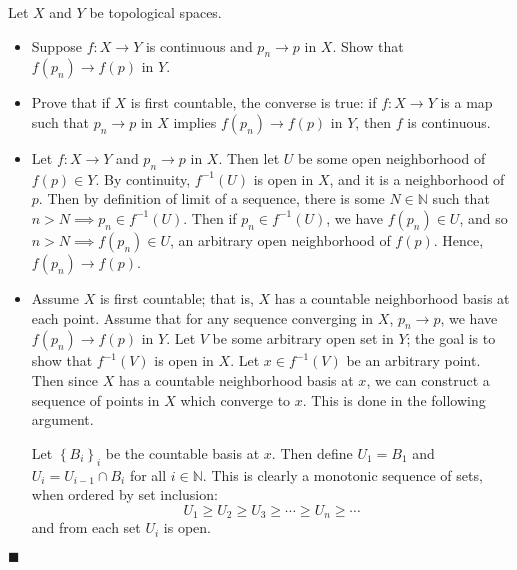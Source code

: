 \documentclass[12pt]{article}
\renewcommand{\qed}{\hfill$\blacksquare$}
\renewenvironment{proof}{\begin{addmargin}[1em]{0em}\begin{newproof}}{\end{newproof}\end{addmargin}\qed}
\newenvironment{problem}[2][Problem]{\begin{trivlist}
\item[\hskip \labelsep {\bfseries #1}\hskip \labelsep {\bfseries #2.}]}{\end{trivlist}}
\begin{document}
\begin{problem}{2-15}
Let $X$ and $Y$ be topological spaces.
\begin{itemize}
	\item Suppose $f:X\rightarrow Y$ is continuous and $p_n\rightarrow p$ in $X$. Show that $f\left(p_n\right)\rightarrow f\left(p\right)$ in $Y$.
	\item Prove that if $X$ is first countable, the converse is true: if $f:X\rightarrow Y$ is a map such that $p_n\rightarrow p$ in $X$ implies $f\left(p_n\right)\rightarrow f\left(p\right)$ in $Y$, then $f$ is continuous.
\end{itemize}
\end{problem}
\begin{proof}
\begin{itemize}
	\item Let $f:X\rightarrow Y$ and $p_n\rightarrow p$ in $X$. Then let $U$ be some open neighborhood of $f\left(p\right) \in Y$. By continuity, $f^{-1}\left(U\right)$ is open in $X$, and it is a neighborhood of $p$. Then by definition of limit of a sequence, there is some $N \in \mathbb{N}$ such that $n>N \implies p_n \in f^{-1}\left(U\right)$. Then if $p_n \in f^{-1}\left(U\right)$, we have $f\left(p_n\right)\in U$, and so $n>N \implies f\left(p_n\right)\in U$, an arbitrary open neighborhood of $f\left(p\right)$. Hence, $f\left(p_n\right)\rightarrow f\left(p\right)$.
	\item Assume $X$ is first countable; that is, $X$ has a countable neighborhood basis at each point. Assume that for any sequence converging in $X$, $p_n \rightarrow p$, we have $f\left(p_n\right)\rightarrow f\left(p\right)$ in $Y$. Let $V$ be some arbitrary open set in $Y$; the goal is to show that $f^{-1}\left(V\right)$ is open in $X$. Let $x\in f^{-1}\left(V\right)$ be an arbitrary point. Then since $X$ has a countable neighborhood basis at $x$, we can construct a sequence of points in $X$ which converge to $x$. This is done in the following argument.
	
	Let $\left\{B_i\right\}_i$ be the countable basis at $x$. Then define $U_1 = B_1$ and $U_i = U_{i-1}\cap B_i$ for all $i\in \mathbb{N}$. This is clearly a monotonic sequence of sets, when ordered by set inclusion: $$ U_1 \geq U_2 \geq U_3 \geq \cdots \geq U_n \geq \cdots $$ and from each set $U_i$ is open.  
\end{itemize}
\end{proof}
\end{document}
